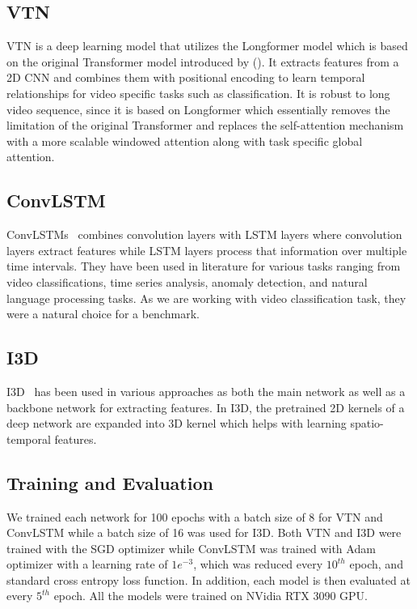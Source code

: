 \documentclass[letterpaper]{article}
\begin{document}
\subsection{VTN}

VTN is a deep learning model that utilizes the Longformer \cite{longformer} model which is based on the original Transformer model introduced by \citeauthor{transformer} (\citeyear{transformer}).  It extracts features from a 2D CNN and combines them with positional encoding to learn temporal relationships for video specific tasks such as classification. It is robust to long video sequence, since it is based on Longformer which essentially removes the limitation of the original Transformer and replaces the self-attention mechanism with a more scalable windowed attention along with task specific global attention.

\subsection{ConvLSTM}

ConvLSTMs~\cite{lstm1,lstm2} combines convolution layers with LSTM layers where convolution layers extract features while LSTM layers process that information over multiple time intervals. They have been used in literature for various tasks ranging from video classifications, time series analysis, anomaly detection, and natural language processing tasks. As we are working with video classification task, they were a natural choice for a benchmark.

\subsection{I3D}

I3D~\cite{i3d} has been used in various approaches as both the main network as well as a backbone network for extracting features. In I3D, the pretrained 2D kernels of a deep network are expanded into 3D kernel which helps with learning spatio-temporal features. 


\subsection{Training and Evaluation}
We trained each network for 100 epochs with a batch size of 8 for VTN and ConvLSTM while a batch size of 16 was used for I3D. Both VTN and I3D were trained with the SGD optimizer while ConvLSTM was trained with Adam optimizer with a learning rate of $1e^{-3}$, which was reduced every $10^{th}$ epoch, and standard cross entropy loss function. In addition, each model is then evaluated at every $5^{th}$ epoch. All the models were trained on NVidia RTX 3090 GPU. 
\end{document}
